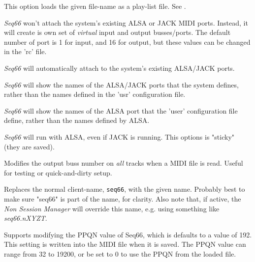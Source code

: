       This option loads the given file-name as a play-list file.
      See .



      \textsl{Seq66} won't attach the system's existing ALSA or JACK MIDI ports.
      Instead, it will create is own set of \textsl{virtual}
      input and output busses/ports.  The default number of port is 1 for input,
      and 16 for output, but these values can be changed in the 'rc' file.


      \textsl{Seq66} will automatically attach to the system's existing
      ALSA/JACK ports.


      \textsl{Seq66} will show the names of the ALSA/JACK ports that the system
      defines, rather than the names defined in the 'usr' configuration file.

      \textsl{Seq66} will show the names of the ALSA port that the 'user'
      configuration file define, rather than the names defined by ALSA.



      \textsl{Seq66} will run with ALSA, even if JACK is running.
      This options is "sticky" (they are saved).

      Modifies the output buss number on \textsl{all} tracks when a MIDI file is
      read.  Useful for testing or quick-and-dirty setup.

      Replaces the normal client-name, \texttt{seq66}, with the given name.
      Probably best to make sure "seq66" is part of the name, for clarity.
      Also note that, if active, the \textsl{Non Session Manager} will override
      this name, e.g. using something like \textsl{seq66.nXYZT}.

      Supports modifying the PPQN value of Seq66, which is
      defaults to a value of 192.  This setting
      is written into the MIDI file when it is saved.
      The PPQN value can range from 32 to 19200, or
      be set to 0 to use the PPQN from the loaded file.

